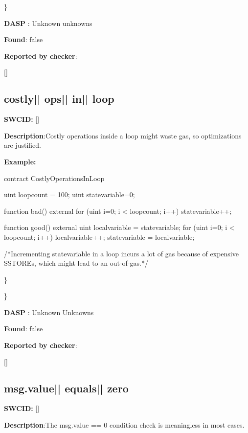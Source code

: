 \documentclass{article}
\begin{document}
\} 

\textbf{DASP} : Unknown unknowns

\textbf{Found}: false

\textbf{Reported by checker}: 
\begin{ffcode} 

[]
\end{ffcode} 
\subsection{costly{|\textunderscore| }ops{|\textunderscore| }in{|\textunderscore| }loop} 
\textbf{SWC{\textunderscore }ID:} []

\textbf{Description}:Costly operations inside a loop might waste gas, so optimizations are justified.


\textbf{Example:} 
\begin{ffcode} 

contract CostlyOperationsInLoop{

    uint loop\textunderscore count = 100;
    uint state\textunderscore variable=0;

    function bad() external{
        for (uint i=0; i < loop\textunderscore count; i++){
            state\textunderscore variable++;
        }
    }

    function good() external{
      uint local\textunderscore variable = state\textunderscore variable;
      for (uint i=0; i < loop\textunderscore count; i++){
        local\textunderscore variable++;
      }
      state\textunderscore variable = local\textunderscore variable;
    }
}
 /*Incrementing state\textunderscore variable in a loop incurs a lot of gas because of expensive SSTOREs, which might lead to an out-of-gas.*/ 

\end{ffcode} 
\} 

\} 

\textbf{DASP} : Unknown Unknowns

\textbf{Found}: false

\textbf{Reported by checker}: 
\begin{ffcode} 

[]
\end{ffcode} 
\subsection{msg.value{|\textunderscore| }equals{|\textunderscore| }zero} 
\textbf{SWC{\textunderscore }ID:} []

\textbf{Description}:The msg.value == 0 condition check is meaningless in most cases.
\end{document}
